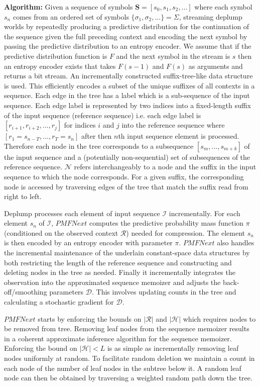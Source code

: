 \textbf{Algorithm:} Given a sequence of symbols $\boldsymbol S=[s_{0}, s_{1}, s_{2}, ...]$ where each symbol $s_{n}$ comes from an ordered set of symbols $\{\sigma_{1}, \sigma_{2}, ...\}=\Sigma$, streaming deplump worlds by repeatedly producing a predictive distribution for the continuation of the sequence given the full preceding context and encoding the next symbol by passing the predictive distribution to an entropy encoder. We assume that if the predictive distribution function is $F$ and the next symbol in the stream is $s$ then an entropy encoder exists that takes $F(s-1)$ and $F(s)$ as arguments and returns a bit stream. An incrementally constructed suffix-tree-like data structure is used. This efficiently encodes a subset of the unique suffixes of all contexts in a sequence. Each edge in the tree has a label which is a sub-sequence of the input sequence. Each edge label is represented by two indices into a fixed-length suffix of the input sequence (reference sequence) i.e. each edge label is $[r_{i+1}, r_{i+2}, ..., r_{j}]$ for indices $i$ and $j$ into the reference sequence where $[r_{1}=s_{n-T}, ..., r_{T}=s_{n}]$ after then $n$th input sequence element is processed. Therefore each node in the tree corresponds to a subsequence $[s_{m}, ..., s_{m+k}]$ of the input sequence and a (potentially non-sequential) set of subsequences of the reference sequence. $\mathcal{N}$ refers interchangeably to a node and the suffix in the input sequence to which the node corresponds. For a given suffix, the corresponding node is accessed by traversing edges of the tree that match the suffix read from right to left.

Deplump processes each element of input sequence $\mathcal{I}$ incrementally. For each element $s_{n}$ of $\mathcal{I}$, $PMFNext$ computes the predictive probability mass function $\pi$ (conditioned on the observed context $\mathcal{R}$) needed for compression. The element $s_{n}$ is then encoded by an entropy encoder with parameter $\pi$. $PMFNext$ also handles the incremental maintenance of the underlain constant-space data structures by both restricting the length of the reference sequence and constructing and deleting nodes in the tree as needed. Finally it incrementally integrates the observation into the approximated sequence memoizer and adjusts the back-off/smoothing parameters $\mathcal{D}$. This involves updating counts in the tree and calculating a stochastic gradient for $\mathcal{D}$.

$PMFNext$ starts by enforcing the bounds on $|\mathcal{R}|$ and $|\mathcal{H}|$ which requires nodes to be removed from tree. Removing leaf nodes from the sequence memoizer results in a coherent approximate inference algorithm for the sequence memoizer. Enforcing the bound on $|\mathcal{H}|<L$ is as simple as incrementally removing leaf nodes uniformly at random. To facilitate random deletion we maintain a count in each node of the number of leaf nodes in the subtree below it. A random leaf node can then be obtained by traversing a weighted random path down the tree.


